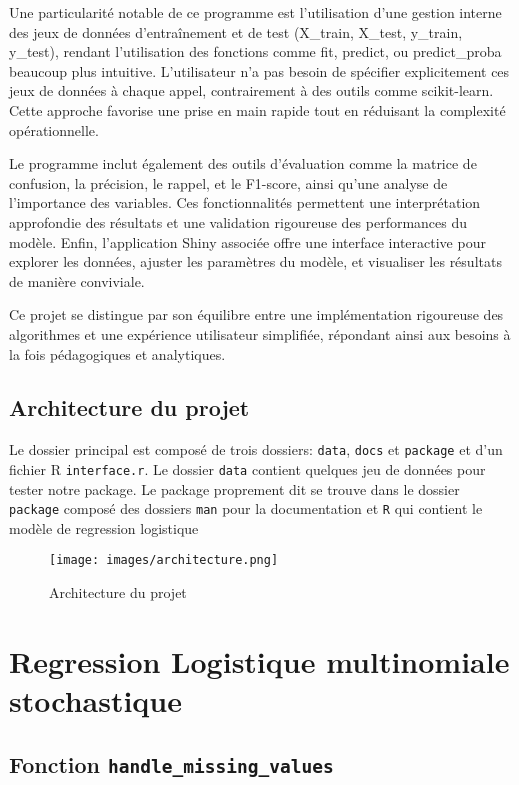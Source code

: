 \documentclass{rapport}
\begin{document}
Une particularité notable de ce programme est l’utilisation d’une gestion interne des jeux de données d’entraînement et de test (X\_train, X\_test, y\_train, y\_test), rendant l’utilisation des fonctions comme fit, predict, ou predict\_proba beaucoup plus intuitive. L’utilisateur n’a pas besoin de spécifier explicitement ces jeux de données à chaque appel, contrairement à des outils comme scikit-learn. Cette approche favorise une prise en main rapide tout en réduisant la complexité opérationnelle.

Le programme inclut également des outils d’évaluation comme la matrice de confusion, la précision, le rappel, et le F1-score, ainsi qu’une analyse de l’importance des variables. Ces fonctionnalités permettent une interprétation approfondie des résultats et une validation rigoureuse des performances du modèle. Enfin, l’application Shiny associée offre une interface interactive pour explorer les données, ajuster les paramètres du modèle, et visualiser les résultats de manière conviviale.

Ce projet se distingue par son équilibre entre une implémentation rigoureuse des algorithmes et une expérience utilisateur simplifiée, répondant ainsi aux besoins à la fois pédagogiques et analytiques.

\subsection{Architecture du projet}
Le dossier principal est composé de trois dossiers: \texttt{data}, \texttt{docs} et \texttt{package} et d'un fichier R \texttt{interface.r}. Le dossier \texttt{data} contient quelques jeu de données pour tester notre package. Le package proprement dit se trouve dans le dossier \texttt{package} composé des dossiers \texttt{man} pour la documentation et \texttt{R} qui contient le modèle de regression logistique

\begin{figure}[H]
    \centering
    \texttt{[image: images/architecture.png]}
    \caption{Architecture du projet}
    \label{fig:architecture}
\end{figure}



\section{Regression Logistique multinomiale stochastique}


\subsection{Fonction \texttt{handle\_missing\_values}}
\end{document}
